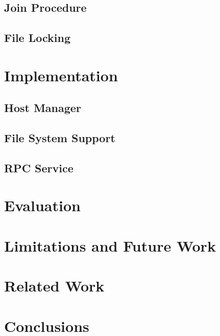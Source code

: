 \documentclass[letterpaper,twocolumn,10pt]{article}
\begin{document}
%    

\subsection{Join Procedure}
\label{sec:joinProcedure}


\subsection{File Locking}
\label{sec:fileLocking}


\section{Implementation}
\label{sec:implementation}


\subsection{Host Manager}
\label{sec:hostManager}


\subsection{File System Support}
\label{sec:fsSupport}


\subsection{RPC Service}
\label{sec:rpcService}


\section{Evaluation}
\label{sec:evaluation}


\section{Limitations and Future Work}
\label{sec:limitations}


\section{Related Work}
\label{sec:relatedWork}


\section{Conclusions}


{\footnotesize 
}


\theendnotes
\end{document}
